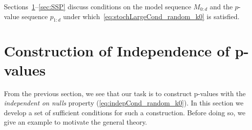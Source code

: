 \documentclass{article}
\begin{document}
Sections~\ref{sec:pValsIndep}--\ref{sec:SSP} discuss conditions on the model sequence $M_{0:d}$ and the $p$-value sequence $p_{1:d}$ under which~\eqref{eq:stochLargeCond_random_k0} is satisfied.



\section{Construction of Independence of p-values}\label{sec:pValsIndep}

From the previous section, we see that our task is to construct p-values with the {\it independent on nulls} property (\ref{eq:indepCond_random_k0}).
In this section we develop a set of sufficient conditions for such a construction. Before doing so, we give an example to motivate
the general theory. 
\end{document}
